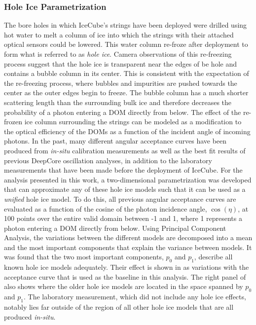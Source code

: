 \subsubsection{Hole Ice Parametrization}
\label{sec:hole-ice-parametrization}

The bore holes in which IceCube's strings have been deployed were drilled using hot water to melt a column of ice into which the strings with their attached optical sensors could be lowered. This water column re-froze after deployment to form what is referred to as \emph{hole ice}. Camera observations of this re-freezing process suggest that the hole ice is transparent near the edges of be hole and contains a bubble column in its center. This is consistent with the expectation of the re-freezing process, where bubbles and impurities are pushed towards the center as the outer edges begin to freeze. The bubble column has a much shorter scattering length than the surrounding bulk ice and therefore decreases the probability of a photon entering a DOM directly from below.
The effect of the re-frozen ice column surrounding the strings can be modeled as a modification to the optical efficiency of the DOMs as a function of the incident angle of incoming photons. In the past, many different angular acceptance curves have been produced from \emph{in-situ} calibration measurements as well as the best fit results of previous DeepCore oscillation analyses, in addition to the laboratory measurements that have been made before the deployment of IceCube. For the analysis presented in this work, a two-dimensional parametrization was developed that can approximate any of these hole ice models such that it can be used as a \emph{unified} hole ice model. To do this, all previous angular acceptance curves are evaluated as a function of the cosine of the photon incidence angle, $\cos(\eta)$, at 100 points over the entire valid domain between -1 and 1, where 1 represents a photon entering a DOM directly from below. Using Principal Component Analysis, the variations between the different models are decomposed into a mean and the most important components that explain the variance between models. It was found that the two most important components, $p_0$ and $p_1$, describe all known hole ice models adequately. Their effect is shown in  as variations with the acceptance curve that is used as the baseline in this analysis. The right panel of  also shows where the older hole ice models are located in the space spanned by $p_0$ and $p_1$. The laboratory measurement, which did not include any hole ice effects, notably lies far outside of the region of all other hole ice models that are all produced \emph{in-situ}.


